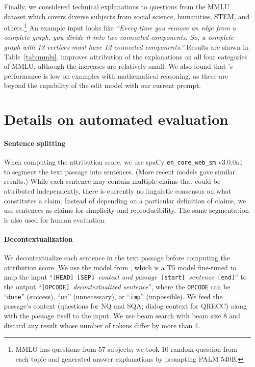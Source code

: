 Finally, we considered technical explanations to questions from the MMLU dataset \cite{hendryckstest2021} which covers diverse subjects from social science, humanities, STEM, and others.\footnote{MMLU has questions from 57 subjects; we took 10 random question from each topic and generated answer explanations by prompting PALM 540B.} An example input looks like \textit{ ``Every time you remove an edge from a complete graph, you divide it into two connected components. So, a complete graph with 13 vertices must have 12 connected components.''} Results are shown in Table~\ref{tab:mmlu}. \approach{} improves attribution of the explanations on all four categories of MMLU, although the increases are relatively small. We also found that \approach{}'s performance is low on examples with mathematical reasoning, as these are beyond the capability of the edit model with our current prompt.

\section{Details on automated evaluation}\label{sec:app-auto-eval}
\paragraph{Sentence splitting} When computing the attribution score, we use spaCy \verb|en_core_web_sm| v3.0.0a1 to segment the text passage into sentences. (More recent models gave similar results.) While each sentence may contain multiple claims that could be attributed independently, there is currently no linguistic consensus on what constitutes a claim. Instead of depending on a particular definition of claims, we use sentences as claims for simplicity and reproducibility. The same segmentation is also used for human evaluation.

\paragraph{Decontextualization} We decontextualize each sentence in the text passage before computing the attribution score. We use the model from \citet{choi2021making}, which is a T5 model fine-tuned to map the input ``\texttt{[HEAD] [SEP] }\textit{context and passage}\texttt{ [start] }\textit{sentence}\texttt{ [end]}'' to the output ``\texttt{[OPCODE] }\textit{decontextualized sentence}'', where the \texttt{OPCODE} can be ``\texttt{done}'' (success), ``\texttt{un}'' (unnecessary), or ``\texttt{imp}'' (impossible). We feed the passage's context (questions for NQ and SQA; dialog context for QRECC) along with the passage itself to the input. We use beam search with beam size 8 and discard any result whose number of tokens differ by more than 4.

